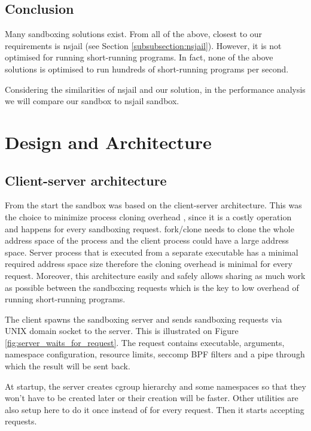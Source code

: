 \documentclass[en]{pracamgr}
\begin{document}
\section{Conclusion}

Many sandboxing solutions exist. From all of the above, closest to our requirements is nsjail (see Section \ref{subsubsection:nsjail}). However, it is not optimised for running short-running programs. In fact, none of the above solutions is optimised to run hundreds of short-running programs per second.

Considering the similarities of nsjail and our solution, in the performance analysis we will compare our sandbox to nsjail sandbox.


\chapter{Design and Architecture}\label{chapter:design}

\section{Client-server architecture}

From the start the sandbox was based on the client-server architecture. This was the choice to minimize process cloning overhead \cite{redis-latency-generated-by-fork}, since it is a costly operation and happens for every sandboxing request. fork/clone needs to clone the whole address space of the process and the client process could have a large address space. Server process that is executed from a separate executable has a minimal required address space size therefore the cloning overhead is minimal for every request. Moreover, this architecture easily and safely allows sharing as much work as possible between the sandboxing requests which is the key to low overhead of running short-running programs.

The client spawns the sandboxing server and sends sandboxing requests via UNIX domain socket to the server. This is illustrated on Figure \ref{fig:server_waits_for_request}. The request contains executable, arguments, namespace configuration, resource limits, seccomp BPF filters and a pipe through which the result will be sent back.

At startup, the server creates cgroup hierarchy and some namespaces so that they won't have to be created later or their creation will be faster. Other utilities are also setup here to do it once instead of for every request. Then it starts accepting requests.
\end{document}
